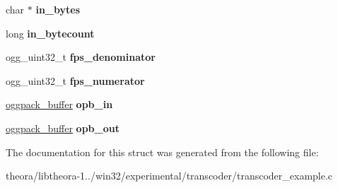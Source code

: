 \begin{DoxyCompactItemize}
\item 
\hypertarget{struct_t_c___i_n_s_t_a_n_c_e_a1e40c17e7d3c1c826b4ed0de32674f1b}{char $\ast$ {\bfseries in\+\_\+bytes}}\label{struct_t_c___i_n_s_t_a_n_c_e_a1e40c17e7d3c1c826b4ed0de32674f1b}

\item 
\hypertarget{struct_t_c___i_n_s_t_a_n_c_e_ab3a039e1d419d7fa19a55ed832ef6ebc}{long {\bfseries in\+\_\+bytecount}}\label{struct_t_c___i_n_s_t_a_n_c_e_ab3a039e1d419d7fa19a55ed832ef6ebc}

\item 
\hypertarget{struct_t_c___i_n_s_t_a_n_c_e_a434218816285efcee835fcbbaa0b6154}{ogg\+\_\+uint32\+\_\+t {\bfseries fps\+\_\+denominator}}\label{struct_t_c___i_n_s_t_a_n_c_e_a434218816285efcee835fcbbaa0b6154}

\item 
\hypertarget{struct_t_c___i_n_s_t_a_n_c_e_a5fce10185005cc76cd98062760b577bd}{ogg\+\_\+uint32\+\_\+t {\bfseries fps\+\_\+numerator}}\label{struct_t_c___i_n_s_t_a_n_c_e_a5fce10185005cc76cd98062760b577bd}

\item 
\hypertarget{struct_t_c___i_n_s_t_a_n_c_e_ad69636e17e41c9f2c0f530ec8977831f}{\hyperlink{structoggpack__buffer}{oggpack\+\_\+buffer} {\bfseries opb\+\_\+in}}\label{struct_t_c___i_n_s_t_a_n_c_e_ad69636e17e41c9f2c0f530ec8977831f}

\item 
\hypertarget{struct_t_c___i_n_s_t_a_n_c_e_a191765e97e3ce1d13ac5fac91d9f7fa6}{\hyperlink{structoggpack__buffer}{oggpack\+\_\+buffer} {\bfseries opb\+\_\+out}}\label{struct_t_c___i_n_s_t_a_n_c_e_a191765e97e3ce1d13ac5fac91d9f7fa6}

\end{DoxyCompactItemize}


The documentation for this struct was generated from the following file\+:\begin{DoxyCompactItemize}
\item 
theora/libtheora-\/1../win32/experimental/transcoder/transcoder\+\_\+example.\+c\end{DoxyCompactItemize}
